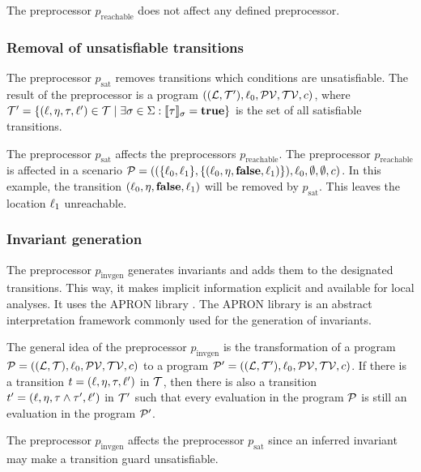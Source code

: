 The preprocessor $p_{\text{reachable}}$ does not affect any defined preprocessor.

\subsubsection{Removal of unsatisfiable transitions}

The preprocessor $p_{\text{sat}}$ removes transitions which conditions are unsatisfiable.
The result of the preprocessor is a program $((\mathcal{L}, \mathcal{T}'), \ell_0, \mathcal{PV}, \mathcal{TV}, c)$, where $\mathcal{T}' = \lbrace (\ell,\eta,\tau,\ell') \in \mathcal{T} \mid \exists \sigma \in \Sigma: \llbracket \tau \rrbracket_{\sigma} = \textbf{true} \rbrace$ is the set of all satisfiable transitions.

The preprocessor $p_{\text{sat}}$ affects the preprocessors $p_{\text{reachable}}$.
The preprocessor $p_{\text{reachable}}$ is affected in a scenario $\mathcal{P} = ((\lbrace \ell_0, \ell_1 \rbrace, \lbrace (\ell_0,\eta,\textbf{false},\ell_1) \rbrace), \ell_0, \emptyset, \emptyset, c)$.
In this example, the transition $(\ell_0,\eta,\textbf{false},\ell_1)$ will be removed by $p_{\text{sat}}$.
This leaves the location $\ell_1$ unreachable.

\subsubsection{Invariant generation}

The preprocessor $p_{\text{invgen}}$ generates invariants and adds them to the designated transitions.
This way, it makes implicit information explicit and available for local analyses.
It uses the APRON library \cite{apron}.
The APRON library is an abstract interpretation framework commonly used for the generation of invariants.

The general idea of the preprocessor $p_{\text{invgen}}$ is the transformation of a program $\mathcal{P} = ((\mathcal{L}, \mathcal{T}), \ell_0, \mathcal{PV}, \mathcal{TV}, c)$ to a program $\mathcal{P}' = ((\mathcal{L}, \mathcal{T}'), \ell_0, \mathcal{PV}, \mathcal{TV}, c)$.
If there is a transition $t = (\ell, \eta, \tau, \ell')$ in $\mathcal{T}$, then there is also a transition $t' = (\ell, \eta, \tau \wedge \tau', \ell')$ in $\mathcal{T}'$ such that every evaluation in the program $\mathcal{P}$ is still an evaluation in the program $\mathcal{P}'$.

The preprocessor $p_{\text{invgen}}$ affects the preprocessor $p_{\text{sat}}$ since an inferred invariant may make a transition guard unsatisfiable.

